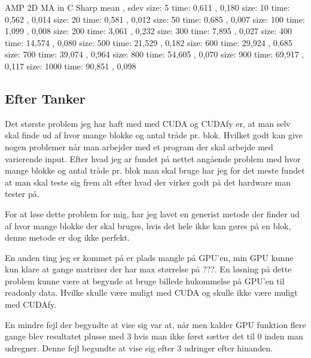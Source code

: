 AMP 2D MA in C Sharp  mean  , sdev  \newline
size: 5 time: 0,611 , 0,180 \newline
size: 10 time: 0,562 , 0,014 \newline
size: 20 time: 0,581 , 0,012 \newline
size: 50 time: 0,685 , 0,007 \newline
size: 100 time: 1,099 , 0,008 \newline
size: 200 time: 3,061 , 0,232 \newline
size: 300 time: 7,895 , 0,027 \newline
size: 400 time: 14,574 , 0,080 \newline
size: 500 time: 21,529 , 0,182 \newline
size: 600 time: 29,924 , 0,685 \newline
size: 700 time: 39,074 , 0,964 \newline
size: 800 time: 54,605 , 0,070 \newline
size: 900 time: 69,917 , 0,117 \newline
size: 1000 time: 90,851 , 0,098 \newline

\subsection{Efter Tanker}
Det største problem jeg har haft med med CUDA og CUDAfy er, at man selv skal finde ud af hvor mange blokke og antal tråde pr. blok. Hvilket godt kan give nogen problemer når man arbejder med et program der skal arbejde med varierende input. Efter hvad jeg ar fundet på nettet angående problem med hvor mange blokke og antal tråde pr. blok man skal bruge har jeg for det meste fundet at man skal teste sig frem alt efter hvad der virker godt på det hardware man tester på.

For at løse dette problem for mig, har jeg lavet en generist metode der finder ud af hvor mange blokke der skal bruges, hvis det hele ikke kan gøres på en blok, denne metode er dog ikke perfekt.

En anden ting jeg er kommet på er plads mangle på GPU'en, min GPU kunne kun klare at gange matrixer der har max størrelse på ???. En løsning på dette problem kunne være at begynde at bruge billede hukommelse på GPU'en til readonly data. Hvilke skulle være muligt med CUDA og skulle ikke være muligt med CUDAfy.

En mindre fejl der begyndte at vise sig var at, når men kalder GPU funktion flere gange blev resultatet plusse med 3 hvis man ikke først sætter det til 0 inden man udregner. Denne fejl begundte at vise sig efter 3 udringer efter hinanden.